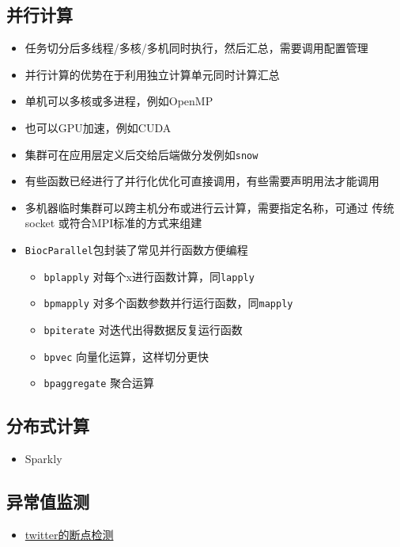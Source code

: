 \documentclass[]{book}
\providecommand{\tightlist}{%
  \setlength{\itemsep}{0pt}\setlength{\parskip}{0pt}}
\begin{document}
\subsection{并行计算}

\begin{itemize}
\tightlist
\item
  任务切分后多线程/多核/多机同时执行，然后汇总，需要调用配置管理
\item
  并行计算的优势在于利用独立计算单元同时计算汇总
\item
  单机可以多核或多进程，例如OpenMP
\item
  也可以GPU加速，例如CUDA
\item
  集群可在应用层定义后交给后端做分发例如\texttt{snow}
\item
  有些函数已经进行了并行化优化可直接调用，有些需要声明用法才能调用
\item
  多机器临时集群可以跨主机分布或进行云计算，需要指定名称，可通过 传统 socket 或符合MPI标准的方式来组建
\item
  \texttt{BiocParallel}包封装了常见并行函数方便编程

  \begin{itemize}
  \tightlist
  \item
    \texttt{bplapply} 对每个x进行函数计算，同\texttt{lapply}
  \item
    \texttt{bpmapply} 对多个函数参数并行运行函数，同\texttt{mapply}
  \item
    \texttt{bpiterate} 对迭代出得数据反复运行函数
  \item
    \texttt{bpvec} 向量化运算，这样切分更快
  \item
    \texttt{bpaggregate} 聚合运算
  \end{itemize}
\end{itemize}

\subsection{分布式计算}

\begin{itemize}
\tightlist
\item
  Sparkly
\end{itemize}

\subsection{异常值监测}

\begin{itemize}
\tightlist
\item
  \href{https://github.com/twitter/BreakoutDetection}{twitter的断点检测}
\end{itemize}
\end{document}
